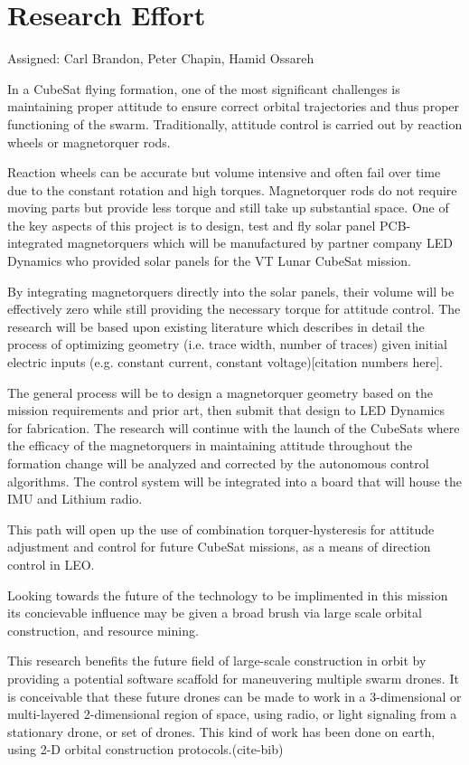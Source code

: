 \section{Research Effort}
Assigned: Carl Brandon, Peter Chapin, Hamid Ossareh

In a CubeSat flying formation, one of the most significant challenges
is maintaining proper attitude to ensure correct orbital trajectories
and thus proper functioning of the swarm. Traditionally, attitude
control is carried out by reaction wheels or magnetorquer
rods.

Reaction wheels can be accurate but volume intensive and often
fail over time due to the constant rotation and high
torques. Magnetorquer rods do not require moving parts but provide
less torque and still take up substantial space. One of the key
aspects of this project is to design, test and fly solar panel
PCB-integrated magnetorquers which will be manufactured by partner
company LED Dynamics who provided solar panels for the VT Lunar
CubeSat mission.

By integrating magnetorquers directly into the solar panels, their
volume will be effectively zero while still providing the necessary
torque for attitude control. The research will be based upon existing
literature which describes in detail the process of optimizing
geometry (i.e. trace width, number of traces) given initial electric
inputs (e.g. constant current, constant voltage)[citation numbers here].

 The general process will be to design a magnetorquer
geometry based on the mission requirements and prior art, then submit
that design to LED Dynamics for fabrication. The research will
continue with the launch of the CubeSats where the efficacy of the
magnetorquers in maintaining attitude throughout the formation change
will be analyzed and corrected by the autonomous control
algorithms. The control system will be integrated into a board that
will house the IMU and Lithium radio.

This path will open up the use of combination torquer-hysteresis for
attitude adjustment and control for future CubeSat missions, as a
means of direction control in LEO.

Looking towards the future of the technology to be implimented in this mission
its concievable influence may be given a broad brush via large scale orbital construction,
and resource mining.

This research benefits the future field of large-scale construction in
orbit by providing a potential software scaffold for maneuvering multiple swarm
drones. It is conceivable that these future drones can be made to work
in a 3-dimensional or multi-layered 2-dimensional region of space,
using radio, or light signaling from a stationary drone, or set of
drones. This kind of work has been done on earth, using 2-D orbital
construction protocols.(cite-bib)

